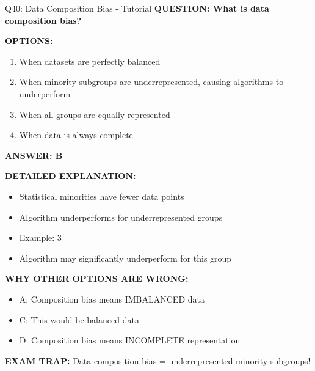 \documentclass[8pt]{beamer}
\begin{document}
	\begin{frame}{Q40: Data Composition Bias - Tutorial}
		\fontsize{6.5}{7.5}\selectfont
		\textbf{QUESTION: What is data composition bias?}
		
		\vspace{0.1cm}
		\textbf{OPTIONS:}
		\begin{enumerate}
			\item When datasets are perfectly balanced
			\item When minority subgroups are underrepresented, causing algorithms to underperform
			\item When all groups are equally represented
			\item When data is always complete
		\end{enumerate}
		
		\vspace{0.1cm}
		\textcolor{myblue}{\textbf{ANSWER: B}}
		
		\vspace{0.1cm}
		\textbf{DETAILED EXPLANATION:}
		\begin{itemize}
			\item Statistical minorities have fewer data points
			\item Algorithm underperforms for underrepresented groups
			\item Example: 3%
			\item Algorithm may significantly underperform for this group
		\end{itemize}
		
		\vspace{0.1cm}
		\textcolor{myred}{\textbf{WHY OTHER OPTIONS ARE WRONG:}}
		\begin{itemize}
			\item \textcolor{myred}{A:} Composition bias means IMBALANCED data
			\item \textcolor{myred}{C:} This would be balanced data
			\item \textcolor{myred}{D:} Composition bias means INCOMPLETE representation
		\end{itemize}
		
		\textcolor{myred}{\textbf{EXAM TRAP:}} Data composition bias = \textcolor{myblue}{underrepresented minority subgroups}!
	\end{frame}
	
\end{document}
